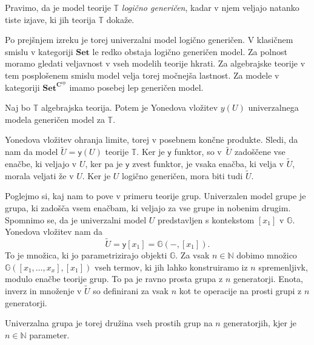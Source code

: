 \documentclass[../kategoricna_logika.tex]{subfiles}
\begin{document}
\begin{definicija}
  Pravimo, da je model teorije $\mathbb{T}$ \emph{logično generičen},
  kadar v njem veljajo natanko tiste izjave, ki jih teorija $\mathbb{T}$ dokaže.
\end{definicija}
Po prejšnjem izreku je torej univerzalni model logično generičen.
V klasičnem smislu v kategoriji $\mathbf{Set}$ le redko obstaja
logično generičen model. Za polnost moramo gledati veljavnost
v vseh modelih teorije hkrati. Za algebrajske teorije v tem posplošenem
smislu model velja torej močnejša lastnost.
Za modele v kategoriji $\mathbf{Set}^{\mathbf{C}^{\mathrm{op}}}$
imamo posebej lep generičen model.
\begin{trditev}
  Naj bo $\mathbb{T}$ algebrajska teorija. Potem je Yonedova vložitev
  $y(U)$ univerzalnega modela generičen model za $\mathbb{T}$.
\end{trditev}
\begin{dokaz}
  Yonedova vložitev ohranja limite, torej v posebnem končne produkte.
  Sledi, da nam da model $\tilde{U} = \mathsf{y}(U)$ teorije $\mathbb{T}$.
  Ker je $\mathsf{y}$ funktor, so v~$\tilde{U}$ zadoščene vse enačbe,
  ki veljajo v $U$, ker pa je $\mathsf{y}$ zvest funktor, je vsaka enačba,
  ki velja v $\tilde{U}$, morala veljati že v $U$.
  Ker je $U$ logično generičen, mora biti tudi $\tilde{U}$.
\end{dokaz}
\begin{primer}
  Poglejmo si, kaj nam to pove v primeru teorije grup. Univerzalen model
  grupe je grupa, ki zadošča vsem enačbam, ki veljajo za vse grupe
  in nobenim drugim. Spomnimo se, da je univerzalni model $U$
  predstavljen s kontekstom $[x_1]$ v $\mathbb{G}$.
  Yonedova vložitev nam da
  \[ \tilde{U} = \mathsf{y}[x_1] = \mathbb{G}(-, [x_1]). \]
  To je množica, ki jo parametrizirajo objekti $\mathbb{G}$.
  Za vsak $n \in \mathbb{N}$ dobimo množico $\mathbb{G}([x_1, \ldots, x_x], [x_1])$
  vseh termov, ki jih lahko konstruiramo iz $n$ spremenljivk,
  modulo enačbe teorije grup.
  To pa je ravno prosta grupa z $n$ generatorji. Enota, inverz in množenje
  v $\tilde{U}$ so definirani za vsak $n$ kot te operacije na
  prosti grupi z $n$ generatorji.

  Univerzalna grupa je torej družina vseh prostih grup na $n$ generatorjih,
  kjer je $n \in \mathbb{N}$ parameter.
\end{primer}
%
\end{document}
